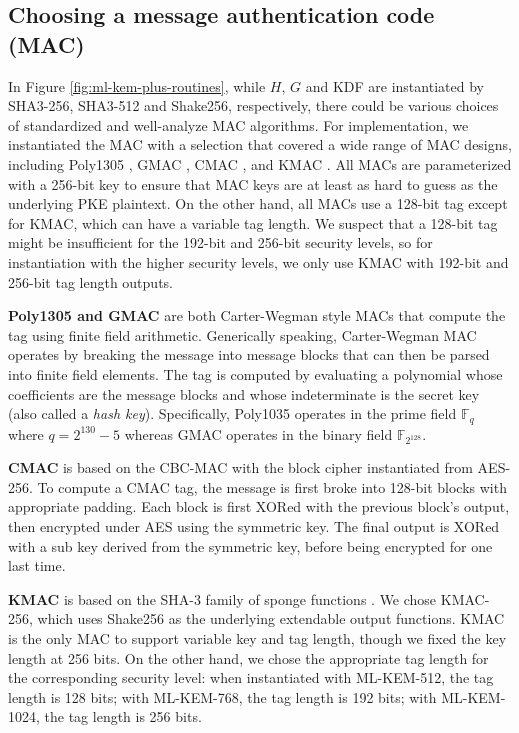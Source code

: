 \documentclass[runningheads]{llncs}
\begin{document}
\subsection{Choosing a message authentication code (MAC)}\label{sec:choosing-a-message-authenticator}
In Figure \ref{fig:ml-kem-plus-routines}, while $H$, $G$ and \textsf{KDF} are instantiated by SHA3-256, SHA3-512 and Shake256, respectively, there could be various choices of standardized and well-analyze MAC algorithms. For implementation, we instantiated the MAC with a selection that covered a wide range of MAC designs, including Poly1305 \cite{bernstein2005poly1305}, GMAC \cite{mcgrew2004galois}, CMAC \cite{iwata2003omac}\cite{black2000cbc}, and KMAC \cite{SP80053r4}. All MACs are parameterized with a 256-bit key to ensure that MAC keys are at least as hard to guess as the underlying PKE plaintext. On the other hand, all MACs use a 128-bit tag except for KMAC, which can have a variable tag length. We suspect that a 128-bit tag might be insufficient for the 192-bit and 256-bit security levels, so for instantiation with the higher security levels, we only use KMAC with 192-bit and 256-bit tag length outputs.

\textbf{Poly1305 and GMAC} are both Carter-Wegman style MACs \cite{wegman1981new} that compute the tag using finite field arithmetic. Generically speaking, Carter-Wegman MAC operates by breaking the message into message blocks that can then be parsed into finite field elements. The tag is computed by evaluating a polynomial whose coefficients are the message blocks and whose indeterminate is the secret key (also called a \textit{hash key}). Specifically, Poly1035 operates in the prime field $\mathbb{F}_q$ where $q = 2^{130} - 5$ whereas GMAC operates in the binary field $\mathbb{F}_{2^{128}}$.

\textbf{CMAC} is based on the CBC-MAC with the block cipher instantiated from AES-256. To compute a CMAC tag, the message is first broke into 128-bit blocks with appropriate padding. Each block is first XORed with the previous block's output, then encrypted under AES using the symmetric key. The final output is XORed with a sub key derived from the symmetric key, before being encrypted for one last time.

\textbf{KMAC} is based on the SHA-3 family of sponge functions \cite{FIPS202}. We chose KMAC-256, which uses Shake256 as the underlying extendable output functions. KMAC is the only MAC to support variable key and tag length, though we fixed the key length at 256 bits. On the other hand, we chose the appropriate tag length for the corresponding security level: when instantiated with ML-KEM-512, the tag length is 128 bits; with ML-KEM-768, the tag length is 192 bits; with ML-KEM-1024, the tag length is 256 bits.
\end{document}
